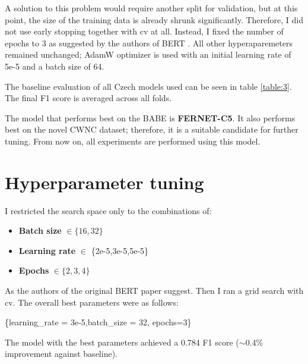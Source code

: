  A solution to this problem would require another split for validation, but at this point, the size of the training data is already shrunk significantly. Therefore, I did not use early stopping together with \gls{cv} at all. Instead, I fixed the number of epochs to 3 as suggested by the authors of BERT \cite{devlin2019bert} . 
 All other hyperaparemeters remained unchanged; AdamW optimizer is used with an initial learning rate of 5e-5 and a batch size of 64.
 
 The baseline evaluation of all Czech models used can be seen in table \ref{table:3}. The final F1 score is averaged across all folds.
 
 The model that performs best on the BABE is \textbf{FERNET-C5}. It also performs best on the novel CWNC dataset; therefore, it is a suitable candidate for further tuning. From now on, all experiments are performed using this model.
 

 

 
 
 
 
\newpage

 \section{Hyperparameter tuning}
I restricted the search space only to the combinations of:
 \begin{itemize}
     \item \textbf{Batch size} $\in \{16,32\}$
     \item \textbf{Learning rate} $\in $ \{2e-5,3e-5,5e-5\}
     \item \textbf{Epochs} $\in \{2,3,4\}$
 \end{itemize}
 
 As the authors of the original BERT paper suggest. Then I ran a grid search with \gls{cv}. The overall best parameters were as follows:
 \begin{center}
      \{learning\_rate = 3e-5,batch\_size = 32, epochs=3\}\label{hyperparams}
 \end{center}
 
 The model with the best parameters achieved a 0.784 F1 score ($\sim$0.4\% improvement against baseline).


 
 






